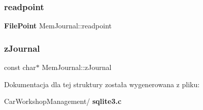 \mbox{\label{struct_mem_journal_a5645d38e1a488b62b5f63112628bf472}} 
\subsubsection{readpoint}
{\footnotesize\ttfamily \textbf{ File\+Point} Mem\+Journal\+::readpoint}

\mbox{\label{struct_mem_journal_a60e0eed44abd876329d1f7d9a4c0d773}} 
\subsubsection{zJournal}
{\footnotesize\ttfamily const char$\ast$ Mem\+Journal\+::z\+Journal}



Dokumentacja dla tej struktury została wygenerowana z pliku\+:\begin{DoxyCompactItemize}
\item 
Car\+Workshop\+Management/\textbf{ sqlite3.\+c}\end{DoxyCompactItemize}
